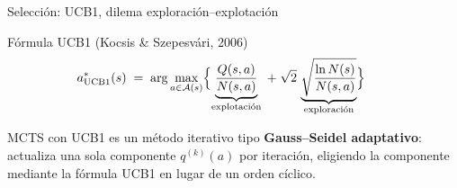 \documentclass[aspectratio=169, 10pt]{beamer}
\begin{document}
\begin{frame}{Selección: UCB1, dilema exploración–explotación}
  \begin{block}{Fórmula UCB1 \footnotesize{(Kocsis \& Szepesvári, 2006)}}
    \[
      a^*_{\text{UCB1}}(s)
      \;=\;
      \arg\max_{a\in\mathcal{A}(s)}
      \Bigl\{
        \underbrace{\dfrac{Q(s,a)}{N(s,a)}}_{\text{explotación}}
        \;+\;
        \sqrt{2}\,\underbrace{\sqrt{\dfrac{\ln N(s)}{N(s,a)}}}_{\text{exploración}}
      \Bigr\}\hspace{2em}
    \]
  \end{block}


  \vspace{0.3cm}
  MCTS con UCB1 es un método iterativo tipo \textbf{Gauss–Seidel adaptativo}:
  actualiza una sola componente $q^{(k)}(a)$ por iteración,
  eligiendo la componente mediante la fórmula UCB1 en lugar de un orden cíclico.
\end{frame}
\end{document}
